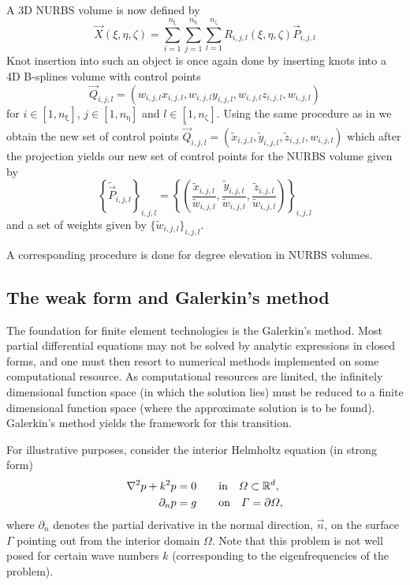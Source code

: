 A 3D NURBS volume is now defined by
\begin{equation*}
	\vec{X}(\xi,\eta,\zeta) = \sum_{i=1}^{n_\upxi}\sum_{j=1}^{n_\upeta}\sum_{l=1}^{n_\upzeta} R_{i,j,l}(\xi,\eta,\zeta)\vec{P}_{i,j,l}
\end{equation*}
Knot insertion into such an object is once again done by inserting knots into a 4D B-splines volume with control points
\begin{equation*}
	\vec{Q}_{i,j,l} = (w_{i,j,l}x_{i,j,l}, w_{i,j,l}y_{i,j,l}, w_{i,j,l}z_{i,j,l}, w_{i,j,l})
\end{equation*}
for $i\in[1,n_\upxi]$, $j\in[1,n_\upeta]$ and $l\in[1,n_\upzeta]$. Using the same procedure as in  we obtain the new set of control points $\tilde{\vec{Q}}_{i,j,l}=(\tilde{x}_{i,j,l}, \tilde{y}_{i,j,l},\tilde{z}_{i,j,l}, w_{i,j,l})$ which after the projection yields our new set of control points for the NURBS volume given by
\begin{equation*}
	\left\{\tilde{\vec{P}}_{i,j,l}\right\}_{i,j,l} = \left\{\left(\frac{\tilde{x}_{i,j,l}}{\tilde{w}_{i,j,l}}, \frac{\tilde{y}_{i,j,l}}{\tilde{w}_{i,j,l}},\frac{\tilde{z}_{i,j,l}}{\tilde{w}_{i,j,l}}\right)\right\}_{i,j,l}
\end{equation*}
and a set of weights given by $\{\tilde{w}_{i,j,l}\}_{i,j,l}$.

A corresponding procedure is done for degree elevation in NURBS volumes.

\subsection{The weak form and Galerkin's method}
The foundation for finite element technologies is the Galerkin's method. Most partial differential equations may not be solved by analytic expressions in closed forms, and one must then resort to numerical methods implemented on some computational resource. As computational resources are limited, the infinitely dimensional function space (in which the solution lies) must be reduced to a finite dimensional function space (where the approximate solution is to be found). Galerkin's method yields the framework for this transition. 

For illustrative purposes, consider the interior Helmholtz equation (in strong form)
\begin{alignat}{3}
	\nabla^2 p + k^2 p &= 0 	\quad &&\text{in}\quad \Omega\subset\mathbb{R}^d,\label{Eq:InteriorHelmholtzEqn}\\
	\partial_n p &= g						&&\text{on}\quad \Gamma=\partial\Omega,\label{Eq:InteriorHelmholtzEqnNeumannCond}
\end{alignat}
where $\partial_n$ denotes the partial derivative in the normal direction, $\vec{n}$, on the surface $\Gamma$ pointing out from the interior domain $\Omega$. Note that this problem is not well posed for certain wave numbers $k$ (corresponding to the eigenfrequencies of the problem).

